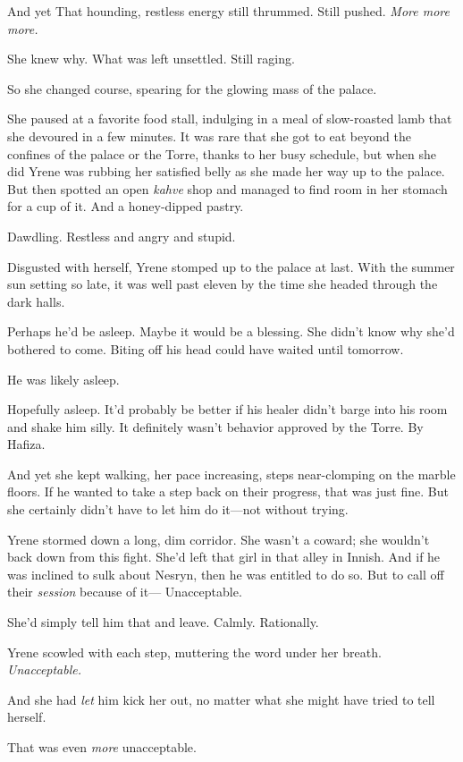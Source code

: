 And yet  That hounding, restless energy still thrummed. Still pushed. \emph{More more more.}

She knew why. What was left unsettled. Still raging.

So she changed course, spearing for the glowing mass of the palace.

She paused at a favorite food stall, indulging in a meal of slow-roasted lamb that she devoured in a few minutes. It was rare that she got to eat beyond the confines of the palace or the Torre, thanks to her busy schedule, but when she did  Yrene was rubbing her satisfied belly as she made her way up to the palace. But then spotted an open
\emph{kahve} shop and managed to find room in her stomach for a cup of it. And a honey-dipped pastry.

Dawdling. Restless and angry and stupid.

Disgusted with herself, Yrene stomped up to the palace at last. With the summer sun setting so late, it was well past eleven by the time she headed through the dark halls.

Perhaps he'd be asleep. Maybe it would be a blessing. She didn't know why she'd bothered to come. Biting off his head could have waited until tomorrow.

He was likely asleep.

Hopefully asleep. It'd probably be better if his healer didn't barge into his room and shake him silly. It definitely wasn't behavior approved by the Torre. By Hafiza.

And yet she kept walking, her pace increasing, steps near-clomping on the marble floors. If he wanted to take a step back on their progress, that was just fine. But she certainly didn't have to let him do it---not without trying.

Yrene stormed down a long, dim corridor. She wasn't a coward; she wouldn't back down from this fight. She'd left that girl in that alley in Innish. And if he was inclined to sulk about Nesryn, then he was entitled to do so. But to call off their \emph{session} because of it--- Unacceptable.

She'd simply tell him that and leave. Calmly. Rationally.

Yrene scowled with each step, muttering the word under her breath.
\emph{Unacceptable.}

And she had \emph{let} him kick her out, no matter what she might have tried to tell herself.

That was even \emph{more} unacceptable.

